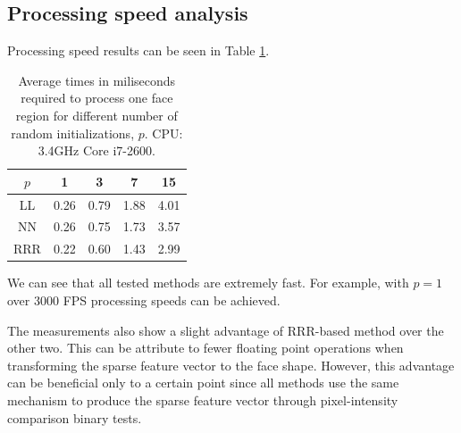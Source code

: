 \documentclass{article}
\begin{document}
	\subsection{Processing speed analysis}
		Processing speed results can be seen in Table \ref{tbl:falignspeed}.
		\begin{table}
			\centering
			\begin{tabular}{| c || c | c | c | c |}
				\hline
				$p$	&	1	&	3	&	7	&	15	\\
				\hline
				\hline
				LL	&	0.26	&	0.79	&	1.88	&	4.01	\\
				\hline
				NN	&	0.26	&	0.75	&	1.73	&	3.57	\\
				\hline
				RRR	&	0.22	&	0.60	&	1.43	&	2.99	\\
				\hline
			\end{tabular}
			\caption
			{
				Average times in miliseconds required to process one face region for different number of random initializations, $p$.
				CPU: 3.4GHz Core i7-2600.
			}
			\label{tbl:falignspeed}
		\end{table}
		We can see that all tested methods are extremely fast.
		For example, with $p=1$ over $3000$ FPS processing speeds can be achieved.

		The measurements also show a slight advantage of RRR-based method over the other two.
		This can be attribute to fewer floating point operations when transforming the sparse feature vector to the face shape.
		However, this advantage can be beneficial only to a certain point since all methods use the same mechanism to produce the sparse feature vector through pixel-intensity comparison binary tests. %
\end{document}
